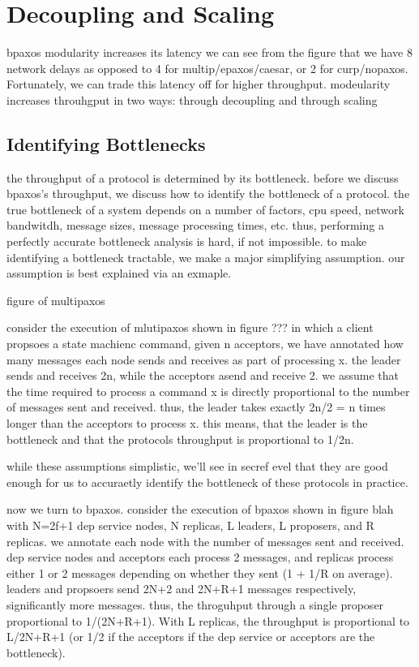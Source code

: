 \section{Decoupling and Scaling}

bpaxos modularity increases its latency
we can see from the figure that we have 8 network delays as opposed to 4 for multip/epaxos/caesar, or 2 for curp/nopaxos. Fortunately, we can trade this latency off for higher throughput. modeularity increases throuhgput in two ways: through decoupling and through scaling

\subsection{Identifying Bottlenecks}
the throughput of a protocol is determined by its bottleneck. before we discuss bpaxos's throughput, we discuss how to identify the bottleneck of a protocol. the true bottleneck of a system depends on a number of factors, cpu speed, network bandwitdh, message sizes, message processing times, etc. thus, performing a perfectly accurate bottleneck analysis is hard, if not impossible. to make identifying a bottleneck tractable, we make a major simplifying assumption. our assumption is best explained via an exmaple.

figure of multipaxos

consider the execution of mlutipaxos shown in figure ??? in which a client propsoes a state machienc command, given n acceptors, we have annotated how many messages each node sends and receives as part of processing x. the leader sends and receives 2n, while the acceptors asend and receive 2. we assume that the time required to process a command x is directly proportional to the number of messages sent and received. thus, the leader takes exactly 2n/2 = n times longer than the acceptors to process x. this means, that the leader is the bottleneck and that the protocols throughput is proportional to 1/2n.

while these assumptions simplistic, we'll see in secref evel that they are good enough for us to accuraetly identify the bottleneck of these protocols in practice.

now we turn to bpaxos. consider the execution of bpaxos shown in figure blah with N=2f+1 dep service nodes, N replicas, L leaders, L proposers, and R replicas. we annotate each node with the number of messages sent and received. dep service nodes and acceptors each process 2 messages, and replicas process either 1 or 2 messages depending on whether they sent (1 + 1/R on average). leaders and propsoers send 2N+2 and 2N+R+1 messages respectively, significantly more messages. thus, the throguhput through a single proposer proportional to 1/(2N+R+1). With L replicas, the throughput is proportional to L/2N+R+1 (or 1/2 if the acceptors if the dep service or acceptors are the bottleneck).

